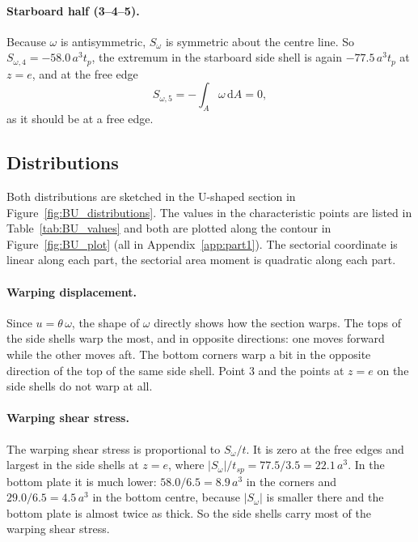 \paragraph{Starboard half (3--4--5).}
Because $\omega$ is antisymmetric, $S_\omega$ is symmetric about the centre line. So
$S_{\omega,4} = -58.0\,a^3t_p$, the extremum in the starboard side shell is again
$-77.5\,a^3t_p$ at $z=e$, and at the free edge
\begin{equation}
    S_{\omega,5} = -\int_A \omega\,\mathrm{d}A = 0 ,
\end{equation}
as it should be at a free edge.

\subsection{Distributions}

Both distributions are sketched in the U-shaped section in Figure~\ref{fig:BU_distributions}. The values in the characteristic points are listed in Table~\ref{tab:BU_values} and both are plotted along the contour in Figure~\ref{fig:BU_plot} (all in Appendix~\ref{app:part1}). The sectorial coordinate is linear along each part, the sectorial area moment is quadratic along each part.

\paragraph{Warping displacement.}
Since $u = \theta\,\omega$, the shape of $\omega$ directly shows how the section warps. The tops of the side shells warp the most, and in opposite directions: one moves forward while the other moves aft. The bottom corners warp a bit in the opposite direction of the top of the same side shell. Point 3 and the points at $z=e$ on the side shells do not warp at all.

\paragraph{Warping shear stress.}
The warping shear stress is proportional to $S_\omega/t$. It is zero at the free edges and largest in the side shells at $z=e$, where $|S_\omega|/t_{sp} = 77.5/3.5 = 22.1\,a^3$. In the bottom plate it is much lower: $58.0/6.5 = 8.9\,a^3$ in the corners and $29.0/6.5 = 4.5\,a^3$ in the bottom centre, because $|S_\omega|$ is smaller there and the bottom plate is almost twice as thick. So the side shells carry most of the warping shear stress.


